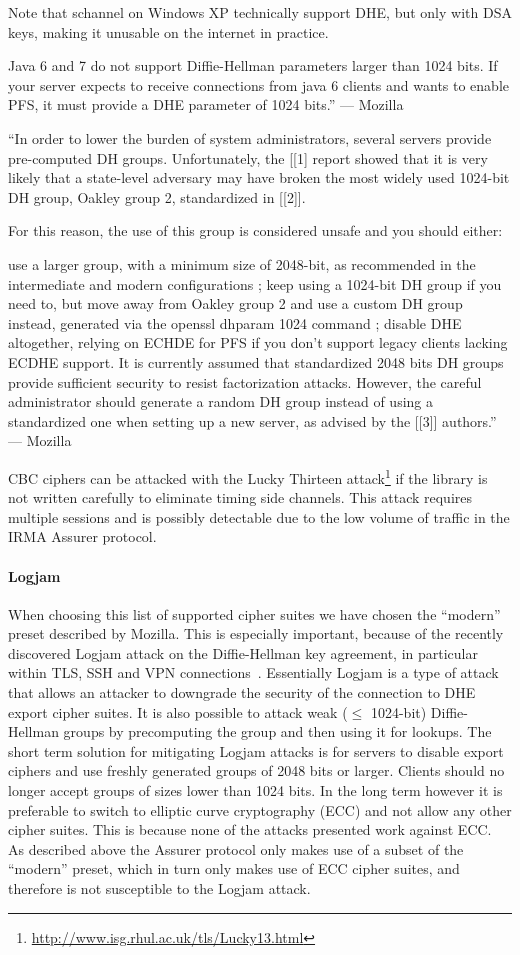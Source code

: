 Note that schannel on Windows XP technically support DHE, but only with DSA keys, making it unusable on the internet in practice.

Java 6 and 7 do not support Diffie-Hellman parameters larger than 1024 bits. If your server expects to receive connections from java 6 clients and wants to enable PFS, it must provide a DHE parameter of 1024 bits.'' --- Mozilla

``In order to lower the burden of system administrators, several servers provide pre-computed DH groups. Unfortunately, the [[1] report showed that it is very likely that a state-level adversary may have broken the most widely used 1024-bit DH group, Oakley group 2, standardized in [[2]].

For this reason, the use of this group is considered unsafe and you should either:

use a larger group, with a minimum size of 2048-bit, as recommended in the intermediate and modern configurations ;
keep using a 1024-bit DH group if you need to, but move away from Oakley group 2 and use a custom DH group instead, generated via the openssl dhparam 1024 command ;
disable DHE altogether, relying on ECHDE for PFS if you don't support legacy clients lacking ECDHE support.
It is currently assumed that standardized 2048 bits DH groups provide sufficient security to resist factorization attacks. However, the careful administrator should generate a random DH group instead of using a standardized one when setting up a new server, as advised by the [[3]] authors.'' --- Mozilla

CBC ciphers can be attacked with the Lucky Thirteen attack\footnote{\url{http://www.isg.rhul.ac.uk/tls/Lucky13.html}} if the library is not written carefully to eliminate timing side channels. This attack requires multiple sessions and is possibly detectable due to the low volume of traffic in the IRMA Assurer protocol.

\paragraph{Logjam}
When choosing this list of supported cipher suites we have chosen the ``modern'' preset described by Mozilla. This is especially important, because of the recently discovered Logjam attack on the Diffie-Hellman key agreement, in particular within TLS, SSH and VPN connections~\cite{logjam}. Essentially Logjam is a type of attack that allows an attacker to downgrade the security of the connection to DHE export cipher suites. It is also possible to attack weak ($\leq$ 1024-bit) Diffie-Hellman groups by precomputing the group and then using it for lookups. The short term solution for mitigating Logjam attacks is for servers to disable export ciphers and use freshly generated groups of 2048 bits or larger. Clients should no longer accept groups of sizes lower than 1024 bits. In the long term however it is preferable to switch to elliptic curve cryptography (ECC) and not allow any other cipher suites. This is because none of the attacks presented work against ECC. As described above the Assurer protocol only makes use of a subset of the ``modern'' preset, which in turn only makes use of ECC cipher suites, and therefore is not susceptible to the Logjam attack.

